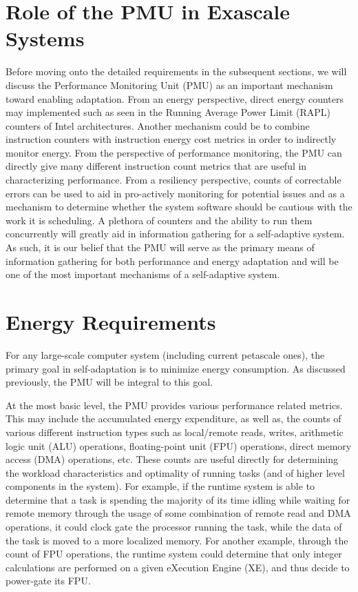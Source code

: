\section{Role of the PMU in Exascale Systems}
    Before moving onto the detailed requirements in the subsequent sections, we will discuss the Performance Monitoring Unit (PMU) as an important mechanism toward enabling adaptation. From an energy perspective, direct energy counters may implemented such as seen in the Running Average Power Limit (RAPL) counters of Intel architectures. Another mechanism could be to combine instruction counters with instruction energy cost metrics in order to indirectly monitor energy. From the perspective of performance monitoring, the PMU can directly give many different instruction count metrics that are useful in characterizing performance. From a resiliency perspective, counts of correctable errors can be used to aid in pro-actively monitoring for potential issues and as a mechanism to determine whether the system software should be cautious with the work it is scheduling. A plethora of counters and the ability to run them concurrently will greatly aid in information gathering for a self-adaptive system. As such, it is our belief that the PMU will serve as the primary means of information gathering for both performance and energy adaptation and will be one of the most important mechanisms of a self-adaptive system.

\section{Energy Requirements}
    For any large-scale computer system (including current petascale ones), the primary goal in self-adaptation is to minimize energy consumption. As discussed previously, the PMU will be integral to this goal. 

    At the most basic level, the PMU provides various performance related metrics. This may include the accumulated energy expenditure, as well as, the counts of various different instruction types such as local/remote reads, writes, arithmetic logic unit (ALU) operations, floating-point unit (FPU) operations, direct memory access (DMA) operations, etc. These counts are useful directly for determining the workload characteristics and optimality of running tasks (and of higher level components in the system). For example, if the runtime system is able to determine that a task is spending the majority of its time idling while waiting for remote memory through the usage of some combination of remote read and DMA operations, it could clock gate the processor running the task, while the data of the task is moved to a more localized memory. For another example, through the count of FPU operations, the runtime system could determine that only integer calculations are performed on a given eXecution Engine (XE), and thus decide to power-gate its FPU.

